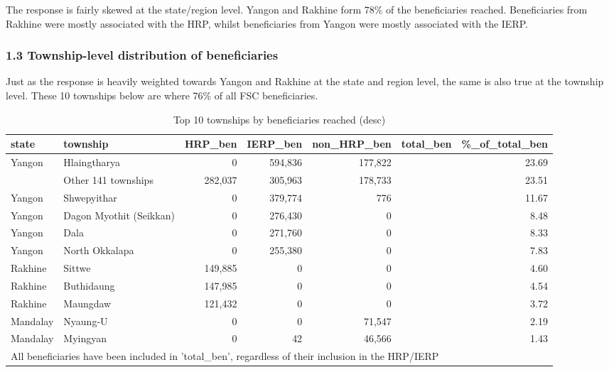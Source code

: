 \documentclass[
]{article}
\begin{document}
The response is fairly skewed at the state/region level. Yangon and
Rakhine form 78\% of the beneficiaries reached. Beneficiaries from
Rakhine were mostly associated with the HRP, whilst beneficiaries from
Yangon were mostly associated with the IERP.

\hypertarget{township-level-distribution-of-beneficiaries}{%
\subsubsection{1.3 Township-level distribution of
beneficiaries}\label{township-level-distribution-of-beneficiaries}}

Just as the response is heavily weighted towards Yangon and Rakhine at
the state and region level, the same is also true at the township level.
These 10 townships below are where 76\% of all FSC beneficiaries.

\begin{table}

\caption{\label{tab:table-top-townships-beneficiaries}Top 10 townships by beneficiaries reached (desc)}
\centering
\begin{tabular}[t]{l|l|r|r|r|>{}r|r}
\hline
state & township & HRP\_ben & IERP\_ben & non\_HRP\_ben & total\_ben & \%\_of\_total\_ben\\
\hline
Yangon & Hlaingtharya & 0 & 594,836 & 177,822 & \cellcolor[HTML]{440154}{\textcolor{white}{772,658}} & 23.69\\
\hline
 & Other 141 townships & 282,037 & 305,963 & 178,733 & \cellcolor[HTML]{450357}{\textcolor{white}{766,733}} & 23.51\\
\hline
Yangon & Shwepyithar & 0 & 379,774 & 776 & \cellcolor[HTML]{27808E}{\textcolor{white}{380,550}} & 11.67\\
\hline
Yangon & Dagon Myothit (Seikkan) & 0 & 276,430 & 0 & \cellcolor[HTML]{1E9B8A}{\textcolor{white}{276,430}} & 8.48\\
\hline
Yangon & Dala & 0 & 271,760 & 0 & \cellcolor[HTML]{1E9D89}{\textcolor{white}{271,760}} & 8.33\\
\hline
Yangon & North Okkalapa & 0 & 255,380 & 0 & \cellcolor[HTML]{1FA187}{\textcolor{white}{255,380}} & 7.83\\
\hline
Rakhine & Sittwe & 149,885 & 0 & 0 & \cellcolor[HTML]{3DBC74}{\textcolor{white}{149,885}} & 4.60\\
\hline
Rakhine & Buthidaung & 147,985 & 0 & 0 & \cellcolor[HTML]{3DBC74}{\textcolor{white}{147,985}} & 4.54\\
\hline
Rakhine & Maungdaw & 121,432 & 0 & 0 & \cellcolor[HTML]{4CC26C}{\textcolor{white}{121,432}} & 3.72\\
\hline
Mandalay & Nyaung-U & 0 & 0 & 71,547 & \cellcolor[HTML]{69CD5B}{\textcolor{white}{71,547}} & 2.19\\
\hline
Mandalay & Myingyan & 0 & 42 & 46,566 & \cellcolor[HTML]{7AD151}{\textcolor{white}{46,608}} & 1.43\\
\hline
\multicolumn{7}{l}{\rule{0pt}{1em}All beneficiaries have been included in 'total\_ben', regardless of their inclusion in the HRP/IERP}\\
\end{tabular}
\end{table}
\end{document}

